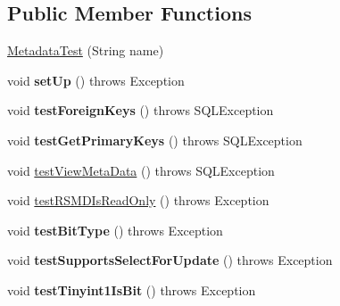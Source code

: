 \subsection*{Public Member Functions}
\begin{DoxyCompactItemize}
\item 
\mbox{\hyperlink{classtestsuite_1_1simple_1_1_metadata_test_a215f8f5f715ab9a78e98b5c48299c240}{Metadata\+Test}} (String name)
\item 
\mbox{\label{classtestsuite_1_1simple_1_1_metadata_test_ae893b849e04ac78a5f340f55afb2cb5c}} 
void {\bfseries set\+Up} ()  throws Exception 
\item 
\mbox{\label{classtestsuite_1_1simple_1_1_metadata_test_a52455a74082f9713ee3d04713e83af54}} 
void {\bfseries test\+Foreign\+Keys} ()  throws S\+Q\+L\+Exception 
\item 
\mbox{\label{classtestsuite_1_1simple_1_1_metadata_test_acfb4e086733eadeb53074eb34cf25c97}} 
void {\bfseries test\+Get\+Primary\+Keys} ()  throws S\+Q\+L\+Exception 
\item 
void \mbox{\hyperlink{classtestsuite_1_1simple_1_1_metadata_test_a57723e10153ca42cc7eac867f896d662}{test\+View\+Meta\+Data}} ()  throws S\+Q\+L\+Exception 
\item 
void \mbox{\hyperlink{classtestsuite_1_1simple_1_1_metadata_test_a64f47fc5191272bd0bcf14cf6370480b}{test\+R\+S\+M\+D\+Is\+Read\+Only}} ()  throws Exception 
\item 
\mbox{\label{classtestsuite_1_1simple_1_1_metadata_test_aa762c68b17236baad08ad296668292b7}} 
void {\bfseries test\+Bit\+Type} ()  throws Exception 
\item 
\mbox{\label{classtestsuite_1_1simple_1_1_metadata_test_a630efab4cd749e3ac7289c477d005d67}} 
void {\bfseries test\+Supports\+Select\+For\+Update} ()  throws Exception 
\item 
\mbox{\label{classtestsuite_1_1simple_1_1_metadata_test_aff832408212ac641e00a62d686e3c528}} 
void {\bfseries test\+Tinyint1\+Is\+Bit} ()  throws Exception 

\end{DoxyCompactItemize}
